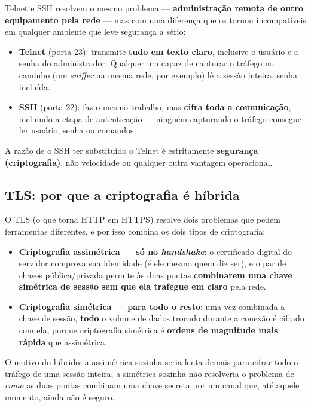 \begin{conceito}
Telnet e SSH resolvem o mesmo problema --- \textbf{administração remota de
outro equipamento pela rede} --- mas com uma diferença que os tornou
incompatíveis em qualquer ambiente que leve segurança a sério:

\begin{itemize}
\item \textbf{Telnet} (porta 23): transmite \textbf{tudo em texto claro},
inclusive o usuário e a senha do administrador. Qualquer um capaz de
capturar o tráfego no caminho (um \textit{sniffer} na mesma rede, por
exemplo) lê a sessão inteira, senha incluída.
\item \textbf{SSH} (porta 22): faz o mesmo trabalho, mas \textbf{cifra toda
a comunicação}, incluindo a etapa de autenticação --- ninguém capturando o
tráfego consegue ler usuário, senha ou comandos.
\end{itemize}

A razão de o SSH ter substituído o Telnet é estritamente \textbf{segurança
(criptografia)}, não velocidade ou qualquer outra vantagem operacional.
\end{conceito}

\subsection{TLS: por que a criptografia é híbrida}

\begin{conceito}
O TLS (o que torna HTTP em HTTPS) resolve dois problemas que pedem
ferramentas diferentes, e por isso combina os dois tipos de criptografia:

\begin{itemize}
\item \textbf{Criptografia assimétrica --- só no \textit{handshake}}: o
certificado digital do servidor comprova sua identidade (é ele mesmo quem
diz ser), e o par de chaves pública/privada permite às duas pontas
\textbf{combinarem uma chave simétrica de sessão} \textbf{sem que ela
trafegue em claro} pela rede.
\item \textbf{Criptografia simétrica --- para todo o resto}: uma vez
combinada a chave de sessão, \textbf{todo} o volume de dados trocado
durante a conexão é cifrado com ela, porque criptografia simétrica é
\textbf{ordens de magnitude mais rápida} que assimétrica.
\end{itemize}

O motivo do híbrido: a assimétrica sozinha seria lenta demais para cifrar
todo o tráfego de uma sessão inteira; a simétrica sozinha não resolveria o
problema de \emph{como} as duas pontas combinam uma chave secreta por um
canal que, até aquele momento, ainda não é seguro.
\end{conceito}

